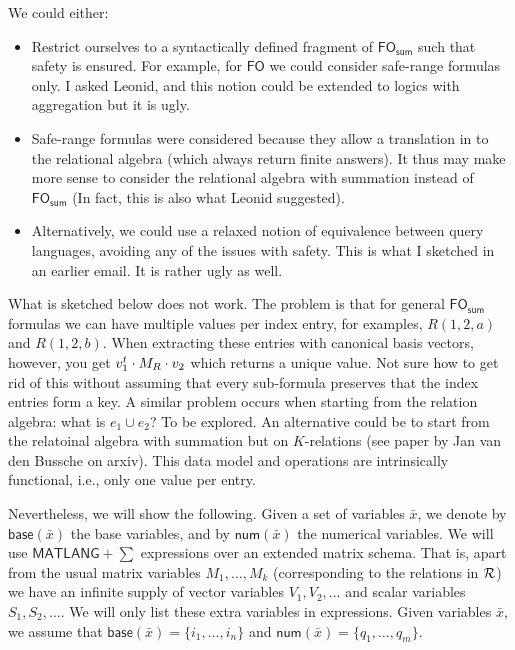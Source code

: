 We could either:
\begin{itemize}
\item Restrict ourselves to a syntactically defined fragment of $\textsf{FO}_{\textsf{sum}}$ such that safety is ensured. For example, for $\textsf{FO}$ we could consider safe-range formulas only. I asked Leonid, and this notion could be extended to logics with aggregation but it is ugly. 
\item Safe-range formulas were considered because they allow a translation in to the relational algebra (which always return finite answers). It thus may make more sense to consider the relational algebra with summation instead of   $\textsf{FO}_{\textsf{sum}}$ (In fact, this is also what Leonid suggested).
\item Alternatively, we could use a relaxed notion of equivalence between query languages, avoiding any of the issues with safety. This is what I sketched in an earlier email. It is rather ugly as well.

\end{itemize}

\begin{todo}
What is sketched below does not work. The problem is that for general $\textsf{FO}_{\textsf{sum}}$ formulas we can have multiple values per index entry, for examples, $R(1,2,a)$ and $R(1,2,b)$.
When extracting these entries with canonical basis vectors, however, you get $v_1^t\cdot M_R\cdot v_2$ which returns a unique value. Not sure how to get rid of this without assuming that every
sub-formula preserves that the index entries form a key. A similar problem occurs when starting from the relation algebra: what is $e_1\cup e_2$? To be explored. An alternative could be to start from the relatoinal algebra with summation but on $K$-relations (see paper by Jan van den Bussche on arxiv). This data model and operations are intrinsically functional, i.e., only one value per entry.
\end{todo}


Nevertheless, we will show the following. Given a set of variables $\bar x$, we denote by $\textsf{base}(\bar x)$ the base variables, and by $\textsf{num}(\bar x)$  the numerical variables.
We will use $\textsf{MATLANG}+\sum$ expressions over an extended matrix schema. That is, apart from the usual matrix variables $M_1,\ldots,M_k$ (corresponding to the relations in ${\cal R}$)
we have an infinite supply of vector variables $V_1,V_2,\ldots$ and scalar variables $S_1,S_2,\ldots$. We will only list these extra variables in expressions.
Given variables $\bar x$, we assume that $\textsf{base}(\bar x)=\{i_1,\ldots,i_n\}$
and  $\textsf{num}(\bar x)=\{q_1,\ldots,q_m\}$. 

